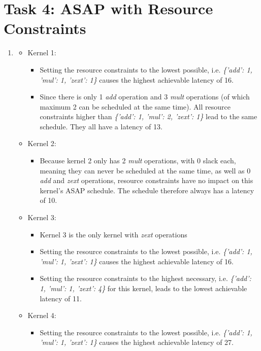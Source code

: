 \documentclass{article}
\begin{document}
    \section{Task 4: ASAP with Resource Constraints}
    \begin{enumerate}
        \item
        \begin{itemize}
            \item Kernel 1:
            \begin{itemize}
                \item Setting the resource constraints to the lowest possible, i.e. \emph{\{'add': 1, 'mul': 1, 'zext': 1\}} causes the highest achievable latency of 16.
                \item Since there is only 1 \emph{add} operation and 3 \emph{mult} operations (of which maximum 2 can be scheduled at the same time). All resource constraints higher than \emph{\{'add': 1, 'mul': 2, 'zext': 1\}} lead to the same schedule. They all have a latency of 13.
            \end{itemize}
            \item Kernel 2:
            \begin{itemize}
                \item Because kernel 2 only has 2 \emph{mult} operations, with 0 slack each, meaning they can never be scheduled at the same time, as well as 0 \emph{add} and \emph{zext} operations, resource constraints have no impact on this kernel's ASAP schedule. The schedule therefore always has a latency of 10.
            \end{itemize}
            \item Kernel 3:
            \begin{itemize}
                \item Kernel 3 is the only kernel with \emph{zext} operations
                \item Setting the resource constraints to the lowest possible, i.e. \emph{\{'add': 1, 'mul': 1, 'zext': 1\}} causes the highest achievable latency of 16.
                \item Setting the resource constraints to the highest necessary, i.e. \emph{\{'add': 1, 'mul': 1, 'zext': 4\}} for this kernel, leads to the lowest achievable latency of 11.
            \end{itemize}
            \item Kernel 4:
            \begin{itemize}
                \item Setting the resource constraints to the lowest possible, i.e. \emph{\{'add': 1, 'mul': 1, 'zext': 1\}} causes the highest achievable latency of 27.

\end{itemize}
\end{itemize}
\end{enumerate}
\end{document}
